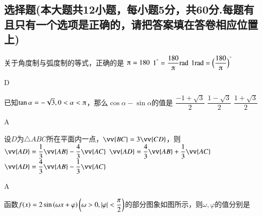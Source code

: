   \begin{exercise}
  \section{选择题(本大题共12小题，每小题5分，共60分.每题有且只有一个选项是正确的，请把答案填在答卷相应位置上)}
    \item%
      关于角度制与弧度制的等式，正确的是\xz
        {$\piup=180$}
        {$1^{\degree}=\dfrac{180}{\piup}\rm{rad}$}
        {$1\rm{rad}=\Bigl(\dfrac{180}{\piup}\Bigr)^\degree$}
      \begin{answer}
        D
      \end{answer}
    \item%
      已知$\tan\alpha=-\sqrt3,0<\alpha<\piup$，那么$\cos\alpha-\sin\alpha$的值是\xz
        {$\dfrac{-1+\sqrt3}2$}
        {$\dfrac{1-\sqrt3}2$}
        {$\dfrac{1+\sqrt3}2$}
      \begin{answer}
        A
      \end{answer}
    \item%
      设$ D $为$\triangle ABC$所在平面内一点，$ \vv{BC}=3\vv{CD} $，则\xz
        {$ \vv{AD}=\dfrac{1}{3}\vv{AB}-\dfrac{4}{3}\vv{AC}$}
        {$ \vv{AD}=\dfrac{4}{3}\vv{AB}+\dfrac{1}{3}\vv{AC}$}
        {$ \vv{AD}=\dfrac{4}{3}\vv{AB}-\dfrac{1}{3}\vv{AC}$}
      \begin{answer}
        A
      \end{answer}
    \item%
      函数$f(x)=2\sin\left(\omega x+\varphi\right)\left(\omega>0,\abs{\varphi}<\dfrac{\pi}{2}\right)$的部分图象如图所示，则$ \omega,\varphi $的值分别是\xz
      \begin{minipage}[b]{0.7\linewidth}
        \vspace{1.5cm}
      \end{minipage}\hfill
      \begin{minipage}[h]{0.3\linewidth}
        \vspace{-1cm}
        \begin{tikzpicture}[>=latex,scale=1]

\end{tikzpicture}
\end{minipage}
\end{exercise}
